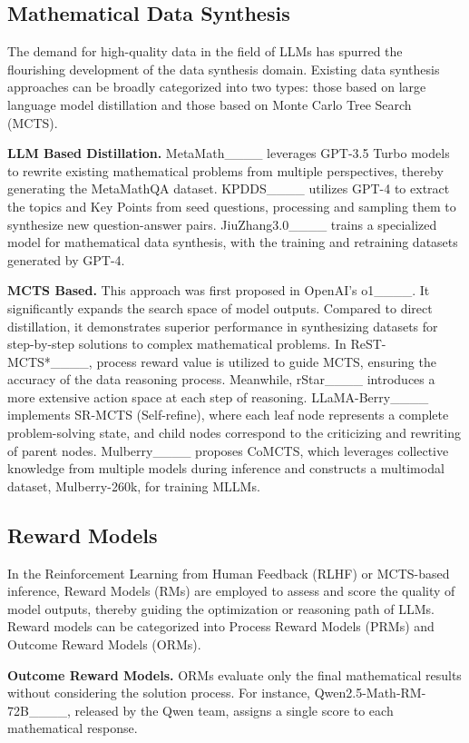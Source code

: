 \subsection{Mathematical Data Synthesis}

The demand for high-quality data in the field of LLMs has spurred the flourishing development of the data synthesis domain. Existing data synthesis approaches can be broadly categorized into two types: those based on large language model distillation and those based on Monte Carlo Tree Search (MCTS).

\textbf{LLM Based Distillation.} MetaMath____ leverages GPT-3.5 Turbo models to rewrite existing mathematical problems from multiple perspectives, thereby generating the  MetaMathQA dataset. KPDDS____ utilizes GPT-4 to extract the topics and Key Points from seed questions, processing and sampling them to synthesize new question-answer pairs. JiuZhang3.0____ trains a specialized model for mathematical data synthesis, with the training and retraining datasets generated by GPT-4.

\textbf{MCTS Based.} This approach was first proposed in OpenAI's o1____. It significantly expands the search space of model outputs. Compared to direct distillation, it demonstrates superior performance in synthesizing datasets for step-by-step solutions to complex mathematical problems. In ReST-MCTS*____, process reward value is utilized to guide MCTS, ensuring the accuracy of the data reasoning process. Meanwhile, rStar____ introduces a more extensive action space at each step of reasoning. LLaMA-Berry____ implements SR-MCTS (Self-refine), where each leaf node represents a complete problem-solving state, and child nodes correspond to the criticizing and rewriting of parent nodes. Mulberry____ proposes CoMCTS, which leverages collective knowledge from multiple models during inference and constructs a multimodal dataset, Mulberry-260k, for training MLLMs.

\subsection{Reward Models}
In the Reinforcement Learning from Human Feedback (RLHF) or MCTS-based inference, Reward Models (RMs) are employed to assess and score the quality of model outputs, thereby guiding the optimization or reasoning path of LLMs. Reward models can be categorized into Process Reward Models (PRMs) and Outcome Reward Models (ORMs).

\textbf{Outcome Reward Models.} ORMs evaluate only the final mathematical results without considering the solution process. For instance, Qwen2.5-Math-RM-72B____, released by the Qwen team, assigns a single score to each mathematical response.

